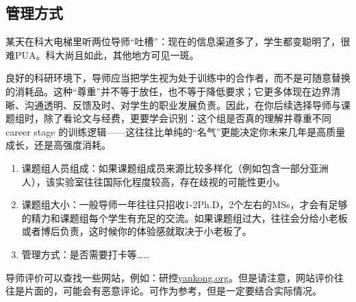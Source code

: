 \subsection*{管理方式}
某天在科大电梯里听两位导师“吐槽”：现在的信息渠道多了，学生都变聪明了，很难PUA。科大尚且如此，其他地方可见一斑。

良好的科研环境下，导师应当把学生视为处于训练中的合作者，而不是可随意替换的消耗品。这种“尊重”并不等于放任，也不等于降低要求；它更多体现在边界清晰、沟通透明、反馈及时、对学生的职业发展负责。因此，在你后续选择导师与课题组时，除了看论文与经费，更要学会识别：这个组是否真的理解并尊重不同 career stage 的训练逻辑——这往往比单纯的“名气”更能决定你未来几年是高质量成长，还是高强度消耗。

\begin{enumerate}
    \item 课题组人员组成：如果课题组成员来源比较多样化（例如包含一部分亚洲人），该实验室往往国际化程度较高，存在歧视的可能性更小。
    \item 课题组大小：一般导师一年往往只招收1-2Ph.D，2个左右的MSs，才会有足够的精力和课题组每个学生有充足的交流。如果课题组过大，往往会分给小老板或者博后负责，这时候你的体验感就取决于小老板了。
    \item 管理方式：是否需要打卡等……
\end{enumerate}

导师评价可以查找一些网站，例如：研控\href{https://www.yankong.org/}{yankong.org}。但是请注意，网站评价往往是片面的，可能会有恶意评论。可作为参考，但是一定要结合实际情况。

